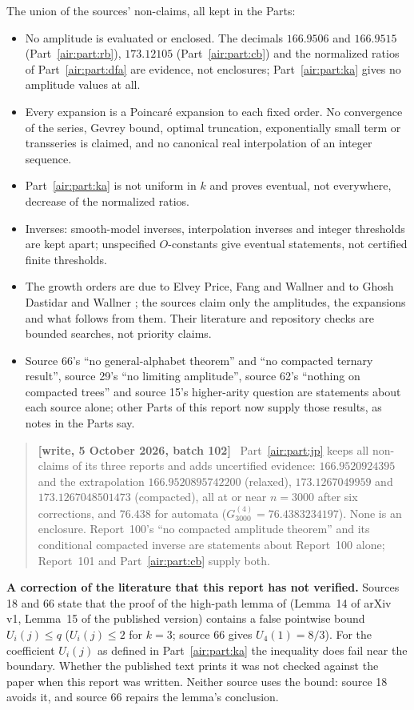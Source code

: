 \documentclass[11pt,letterpaper]{article}
\numberwithin{equation}{section}
\theoremstyle{remark}
\newenvironment{writenotejp}{\par\smallskip\begin{quote}\small\textbf{[write, 5 October 2026, batch 102]}\ }{\end{quote}\smallskip}
\begin{document}
The union of the sources' non-claims, all kept in the Parts:
\begin{itemize}
\item No amplitude is evaluated or enclosed. The decimals $166.9506$ and $166.9515$ (Part~\ref{air:part:rb}), $173.12105$ (Part~\ref{air:part:cb}) and the normalized ratios of Part~\ref{air:part:dfa} are evidence, not enclosures; Part~\ref{air:part:ka} gives no amplitude values at all.
\item Every expansion is a Poincar\'e expansion to each fixed order. No convergence of the series, Gevrey bound, optimal truncation, exponentially small term or transseries is claimed, and no canonical real interpolation of an integer sequence.
\item Part~\ref{air:part:ka} is not uniform in $k$ and proves eventual, not everywhere, decrease of the normalized ratios.
\item Inverses: smooth-model inverses, interpolation inverses and integer thresholds are kept apart; unspecified $O$-constants give eventual statements, not certified finite thresholds.
\item The growth orders are due to Elvey Price, Fang and Wallner \cite{epfw,dfa} and to Ghosh Dastidar and Wallner \cite{gdw}; the sources claim only the amplitudes, the expansions and what follows from them. Their literature and repository checks are bounded searches, not priority claims.
\item Source 66's ``no general-alphabet theorem'' and ``no compacted ternary result'', source 29's ``no limiting amplitude'', source 62's ``nothing on compacted trees'' and source 15's higher-arity question are statements about each source alone; other Parts of this report now supply those results, as notes in the Parts say.
\end{itemize}
\begin{writenotejp}
Part~\ref{air:part:jp} keeps all non-claims of its three reports and adds uncertified evidence: $166.9520924395$ and the extrapolation $166.9520895742200$ (relaxed), $173.1267049959$ and $173.1267048501473$ (compacted), all at or near $n=3000$ after six corrections, and $76.438$ for automata ($G^{(4)}_{3000}=76.4383234197$). None is an enclosure. Report~100's ``no compacted amplitude theorem'' and its conditional compacted inverse are statements about Report~100 alone; Report~101 and Part~\ref{air:part:cb} supply both.
\end{writenotejp}

\textbf{A correction of the literature that this report has not verified.} Sources 18 and 66 state that the proof of the high-path lemma of \cite{gdw} (Lemma~14 of arXiv v1, Lemma~15 of the published version) contains a false pointwise bound $U_i(j)\le q$ ($U_i(j)\le2$ for $k=3$; source 66 gives $U_4(1)=8/3$). For the coefficient $U_i(j)$ as defined in Part~\ref{air:part:ka} the inequality does fail near the boundary. Whether the published text prints it was not checked against the paper when this report was written. Neither source uses the bound: source 18 avoids it, and source 66 repairs the lemma's conclusion.
\end{document}
